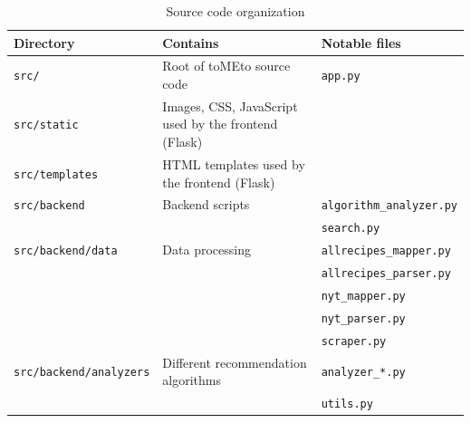 \documentclass{acm_proc_article-sp}
\begin{document}
\begin{table}[h]
       \begin{tabular}{ | l | l | p{5cm} |}
       \hline
       Directory & Contains & Notable files \\ 
       \hline
       \texttt{src/} & Root of toMEto source code & \texttt{app.py} \\ \hline
       \texttt{src/static} & Images, CSS, JavaScript used by the frontend (Flask) & \\ \hline
       \texttt{src/templates} & HTML templates used by the frontend (Flask) & \\ \hline
       \texttt{src/backend} & Backend scripts & \texttt{algorithm\_analyzer.py} \\
                            &                 & \texttt{search.py} \\ \hline
       \texttt{src/backend/data} & Data processing & \texttt{allrecipes\_mapper.py} \\
                                 &                 & \texttt{allrecipes\_parser.py} \\
                                 &                 & \texttt{nyt\_mapper.py}  \\
                                 &                 & \texttt{nyt\_parser.py} \\ 
                                 &                 & \texttt{scraper.py} \\ \hline
       \texttt{src/backend/analyzers} & Different recommendation algorithms & \texttt{analyzer\_*.py} \\
                                      &                                     & \texttt{utils.py} \\ \hline
       \end{tabular}
       \caption{Source code organization}
\end{table}
\end{document}
